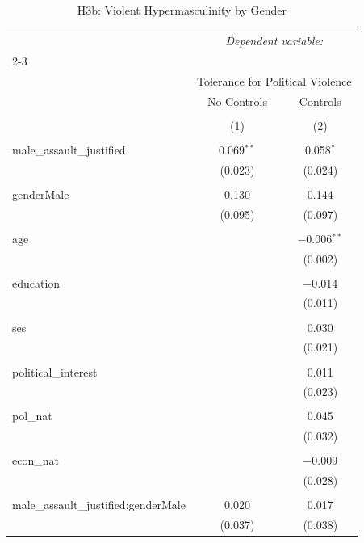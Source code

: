 
\begin{table}[!htbp] \centering 
  \caption{H3b: Violent Hypermasculinity by Gender} 
  \label{} 
\begin{tabular}{@{\extracolsep{5pt}}lcc} 
\\[-1.8ex]\hline 
\hline \\[-1.8ex] 
 & \multicolumn{2}{c}{\textit{Dependent variable:}} \\ 
\cline{2-3} 
\\[-1.8ex] & \multicolumn{2}{c}{Tolerance for Political Violence} \\ 
 & No Controls & Controls \\ 
\\[-1.8ex] & (1) & (2)\\ 
\hline \\[-1.8ex] 
 male\_assault\_justified & 0.069$^{**}$ & 0.058$^{*}$ \\ 
  & (0.023) & (0.024) \\ 
  & & \\ 
 genderMale & 0.130 & 0.144 \\ 
  & (0.095) & (0.097) \\ 
  & & \\ 
 age &  & $-$0.006$^{**}$ \\ 
  &  & (0.002) \\ 
  & & \\ 
 education &  & $-$0.014 \\ 
  &  & (0.011) \\ 
  & & \\ 
 ses &  & 0.030 \\ 
  &  & (0.021) \\ 
  & & \\ 
 political\_interest &  & 0.011 \\ 
  &  & (0.023) \\ 
  & & \\ 
 pol\_nat &  & 0.045 \\ 
  &  & (0.032) \\ 
  & & \\ 
 econ\_nat &  & $-$0.009 \\ 
  &  & (0.028) \\ 
  & & \\ 
 male\_assault\_justified:genderMale & 0.020 & 0.017 \\ 
  & (0.037) & (0.038) \\ 

\end{tabular}
\end{table}
